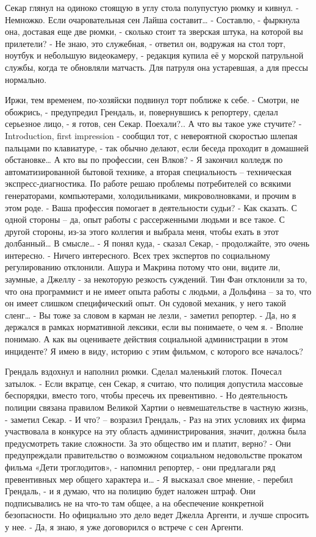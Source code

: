 \documentclass[10pt,final]{book}
\begin{document}
Секар глянул на одиноко стоящую в углу стола полупустую рюмку и кивнул.
- Немножко. Если очаровательная сен Лайша составит\ldots{}
- Составлю, - фыркнула она, доставая еще две рюмки, - сколько стоит та зверская штука, на которой вы прилетели?
- Не знаю, это служебная, - ответил он, водружая на стол торт, ноутбук и небольшую видеокамеру, - редакция купила её у морской патрульной службы, когда те обновляли матчасть. Для патруля она устаревшая, а для прессы нормально.

Иржи, тем временем, по-хозяйски подвинул торт поближе к себе.
- Смотри, не обожрись, - предупредил Грендаль, и, повернувшись к репортеру, сделал серьезное лицо, - я готов, сен Секар. Поехали?.. А что вы такое уже стучите?
- Introduction, first impression - сообщил тот, с невероятной скоростью шлепая пальцами по клавиатуре, - так обычно делают, если беседа проходит в домашней обстановке\ldots{} А кто вы по профессии, сен Влков?
- Я закончил колледж по автоматизированной бытовой технике, а вторая специальность -- техническая экспресс-диагностика. По работе решаю проблемы потребителей со всякими генераторами, компьютерами, холодильниками, микроволновками, и прочим в этом роде.
- Ваша профессия помогает в деятельности судьи?
- Как сказать. С одной стороны -- да, опыт работы с рассерженными людьми и все такое. С другой стороны, из-за этого коллегия и выбрала меня, чтобы ехать в этот долбанный\ldots{} В смысле\ldots{}
- Я понял куда, - сказал Секар, - продолжайте, это очень интересно.
- Ничего интересного. Всех трех экспертов по социальному регулированию отклонили. Ашура и Макрина потому что они, видите ли, заумные, а Джеллу - за некоторую резкость суждений. Тин Фан отклонили за то, что она программист и не имеет опыта работы с людьми, а Дольфина -- за то, что он имеет слишком специфический опыт. Он судовой механик, у него такой сленг\ldots{}
- Вы тоже за словом в карман не лезли, - заметил репортер.
- Да, но я держался в рамках нормативной лексики, если вы понимаете, о чем я.
- Вполне понимаю. А как вы оцениваете действия социальной администрации в этом инциденте? Я имею в виду, историю с этим фильмом, с которого все началось?

Грендаль вздохнул и наполнил рюмки. Сделал маленький глоток. Почесал затылок.
- Если вкратце, сен Секар, я считаю, что полиция допустила массовые беспорядки, вместо того, чтобы пресечь их превентивно.
- Но деятельность полиции связана правилом Великой Хартии о невмешательстве в частную жизнь, - заметил Секар.
- И что? -- возразил Грендаль, - Раз на этих условиях их фирма участвовала в конкурсе на эту область администрирования, значит, должна была предусмотреть такие сложности. За это общество им и платит, верно?
- Они предупреждали правительство о возможном социальном недовольстве прокатом фильма «Дети троглодитов», - напомнил репортер, - они предлагали ряд превентивных мер общего характера и\ldots{}
- Я высказал свое мнение, - перебил Грендаль, - и я думаю, что на полицию будет наложен штраф. Они подписывались не на что-то там общее, а на обеспечение конкретной безопасности. Но официально это дело ведет Джелла Аргенти, и лучше спросить у нее.
- Да, я знаю, я уже договорился о встрече с сен Аргенти.
\end{document}
